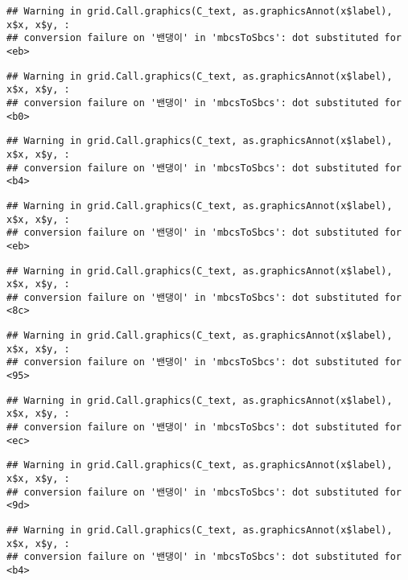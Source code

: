 \documentclass[
]{article}
\begin{document}
\begin{verbatim}
## Warning in grid.Call.graphics(C_text, as.graphicsAnnot(x$label), x$x, x$y, :
## conversion failure on '밴댕이' in 'mbcsToSbcs': dot substituted for <eb>
\end{verbatim}

\begin{verbatim}
## Warning in grid.Call.graphics(C_text, as.graphicsAnnot(x$label), x$x, x$y, :
## conversion failure on '밴댕이' in 'mbcsToSbcs': dot substituted for <b0>
\end{verbatim}

\begin{verbatim}
## Warning in grid.Call.graphics(C_text, as.graphicsAnnot(x$label), x$x, x$y, :
## conversion failure on '밴댕이' in 'mbcsToSbcs': dot substituted for <b4>
\end{verbatim}

\begin{verbatim}
## Warning in grid.Call.graphics(C_text, as.graphicsAnnot(x$label), x$x, x$y, :
## conversion failure on '밴댕이' in 'mbcsToSbcs': dot substituted for <eb>
\end{verbatim}

\begin{verbatim}
## Warning in grid.Call.graphics(C_text, as.graphicsAnnot(x$label), x$x, x$y, :
## conversion failure on '밴댕이' in 'mbcsToSbcs': dot substituted for <8c>
\end{verbatim}

\begin{verbatim}
## Warning in grid.Call.graphics(C_text, as.graphicsAnnot(x$label), x$x, x$y, :
## conversion failure on '밴댕이' in 'mbcsToSbcs': dot substituted for <95>
\end{verbatim}

\begin{verbatim}
## Warning in grid.Call.graphics(C_text, as.graphicsAnnot(x$label), x$x, x$y, :
## conversion failure on '밴댕이' in 'mbcsToSbcs': dot substituted for <ec>
\end{verbatim}

\begin{verbatim}
## Warning in grid.Call.graphics(C_text, as.graphicsAnnot(x$label), x$x, x$y, :
## conversion failure on '밴댕이' in 'mbcsToSbcs': dot substituted for <9d>
\end{verbatim}

\begin{verbatim}
## Warning in grid.Call.graphics(C_text, as.graphicsAnnot(x$label), x$x, x$y, :
## conversion failure on '밴댕이' in 'mbcsToSbcs': dot substituted for <b4>
\end{verbatim}
\end{document}
